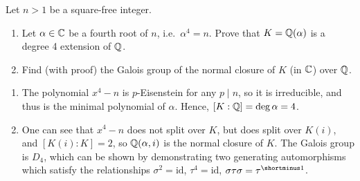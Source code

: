 \begin{question}[subtitle = August 2021 Problem 2,ID=Aug21_2]
Let $n > 1$ be a square-free integer.
\begin{enumerate}
    \item Let $\alpha \in \mathbb{C}$ be a fourth root of $n$, i.e.\ $\alpha^4 = n$. Prove that $K = \mathbb{Q}(\alpha)$ is a degree 4 extension of $\mathbb{Q}$.
    \item Find (with proof) the Galois group of the normal closure of $K$ (in $\mathbb{C}$) over $\mathbb{Q}$.
\end{enumerate}
\end{question}
\begin{solution}
\begin{enumerate}
    \item The polynomial $x^4-n$ is $p$-Eisenstein for any $p \mid n$, so it is irreducible, and thus is the minimal polynomial of $\alpha$. Hence, $[K:\mathbb{Q}] = \deg \alpha = 4$.
    \item One can see that $x^4-n$ does not split over $K$, but does split over $K(i)$, and $[K(i):K]=2$, so $\mathbb{Q}(\alpha,i)$ is the normal closure of $K$. The Galois group is $D_4$, which can be shown by demonstrating two generating automorphisms which satisfy the relationships $\sigma^2 = \mathrm{id}$, $\tau^4 = \mathrm{id}$, $\sigma \tau \sigma = \tau\inv$.
\end{enumerate}
\end{solution}

